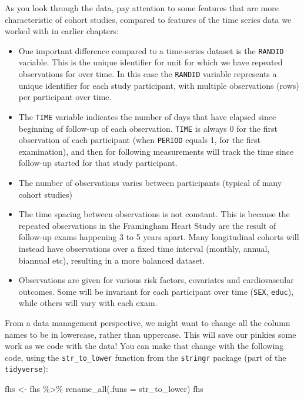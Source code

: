 \documentclass[
]{book}
\newenvironment{Shaded}{\begin{snugshade}}{\end{snugshade}}
\newcommand{\AttributeTok}[1]{\textcolor[rgb]{0.77,0.63,0.00}{#1}}
\newcommand{\FunctionTok}[1]{\textcolor[rgb]{0.00,0.00,0.00}{#1}}
\newcommand{\NormalTok}[1]{#1}
\newcommand{\OtherTok}[1]{\textcolor[rgb]{0.56,0.35,0.01}{#1}}
\newcommand{\SpecialCharTok}[1]{\textcolor[rgb]{0.00,0.00,0.00}{#1}}
\providecommand{\tightlist}{%
  \setlength{\itemsep}{0pt}\setlength{\parskip}{0pt}}
\begin{document}
As you look through the data, pay attention to some features that are more characteristic of cohort studies, compared to features of the time series data we worked with in earlier chapters:

\begin{itemize}
\tightlist
\item
  One important difference compared to a time-series dataset is the \texttt{RANDID} variable. This is the unique identifier for unit for which we have repeated observations for over time.
  In this case the \texttt{RANDID} variable represents a unique identifier for each study participant, with multiple observations (rows) per participant over time.
\item
  The \texttt{TIME} variable indicates the number of days that have elapsed since beginning of follow-up of each observation. \texttt{TIME} is always 0 for the first observation of each participant (when \texttt{PERIOD} equals 1, for the first examination), and then for following measurements will track the time since follow-up started for that study participant.
\item
  The number of observations varies between participants (typical of many cohort studies)
\item
  The time spacing between observations is not constant. This is because the repeated observations in the Framingham Heart Study are the result of follow-up exams happening 3 to 5 years apart. Many longitudinal cohorts will instead have observations over a fixed time interval (monthly, annual, biannual etc), resulting in a more balanced dataset.
\item
  Observations are given for various risk factors, covariates and cardiovascular outcomes. Some will be invariant for each participant over time (\texttt{SEX}, \texttt{educ}), while others will vary with each exam.
\end{itemize}

From a data management perspective, we might want to change all the column names
to be in lowercase, rather than uppercase. This will save our pinkies some
work as we code with the data! You can make that change with the following
code, using the \texttt{str\_to\_lower} function from the \texttt{stringr} package (part of
the \texttt{tidyverse}):

\begin{Shaded}
\begin{Highlighting}[]
\NormalTok{fhs }\OtherTok{\textless{}{-}}\NormalTok{ fhs }\SpecialCharTok{\%\textgreater{}\%} 
  \FunctionTok{rename\_all}\NormalTok{(}\AttributeTok{.funs =}\NormalTok{ str\_to\_lower)}
\NormalTok{fhs}
\end{Highlighting}
\end{Shaded}
\end{document}
